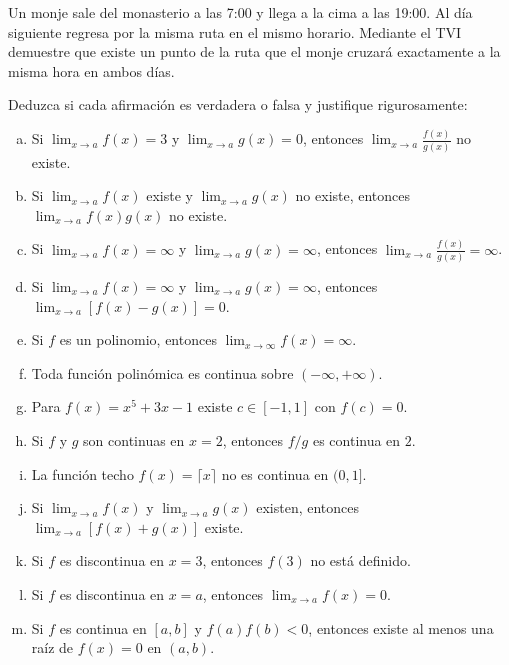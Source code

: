 \begin{prob}
Un monje sale del monasterio a las 7:00 y llega a la cima a las 19:00.
Al día siguiente regresa por la misma ruta en el mismo horario. Mediante
el TVI demuestre que existe un punto de la ruta que el monje cruzará
exactamente a la misma hora en ambos días.
\end{prob}

\begin{prob}
Deduzca si cada afirmación es verdadera o falsa y justifique
rigurosamente:
\begin{enumerate}[a)]
    \item Si $\lim_{x\to a}f(x)=3$ y $\lim_{x\to a}g(x)=0$, entonces
    $\lim_{x\to a}\frac{f(x)}{g(x)}$ no existe.
    \item Si $\lim_{x\to a}f(x)$ existe y $\lim_{x\to a}g(x)$ no existe,
    entonces $\lim_{x\to a}f(x)g(x)$ no existe.
    \item Si $\lim_{x\to a}f(x)=\infty$ y $\lim_{x\to a}g(x)=\infty$,
    entonces $\lim_{x\to a}\frac{f(x)}{g(x)}=\infty$.
    \item Si $\lim_{x\to a}f(x)=\infty$ y $\lim_{x\to a}g(x)=\infty$,
    entonces $\lim_{x\to a}[f(x)-g(x)]=0$.
    \item Si $f$ es un polinomio, entonces $\lim_{x\to\infty}f(x)=\infty$.
    \item Toda función polinómica es continua sobre $(-\infty,+\infty)$.
    \item Para $f(x)=x^5+3x-1$ existe $c\in[-1,1]$ con $f(c)=0$.
    \item Si $f$ y $g$ son continuas en $x=2$, entonces $f/g$ es continua
    en $2$.
    \item La función techo $f(x)=\lceil x\rceil$ no es continua en
    $(0,1]$.
    \item Si $\lim_{x\to a}f(x)$ y $\lim_{x\to a}g(x)$ existen, entonces
    $\lim_{x\to a}[f(x)+g(x)]$ existe.
    \item Si $f$ es discontinua en $x=3$, entonces $f(3)$ no está
    definido.
    \item Si $f$ es discontinua en $x=a$, entonces
    $\lim_{x\to a}f(x)=0$.
    \item Si $f$ es continua en $[a,b]$ y $f(a)f(b)<0$, entonces existe
    al menos una raíz de $f(x)=0$ en $(a,b)$.
\end{enumerate}
\end{prob}
